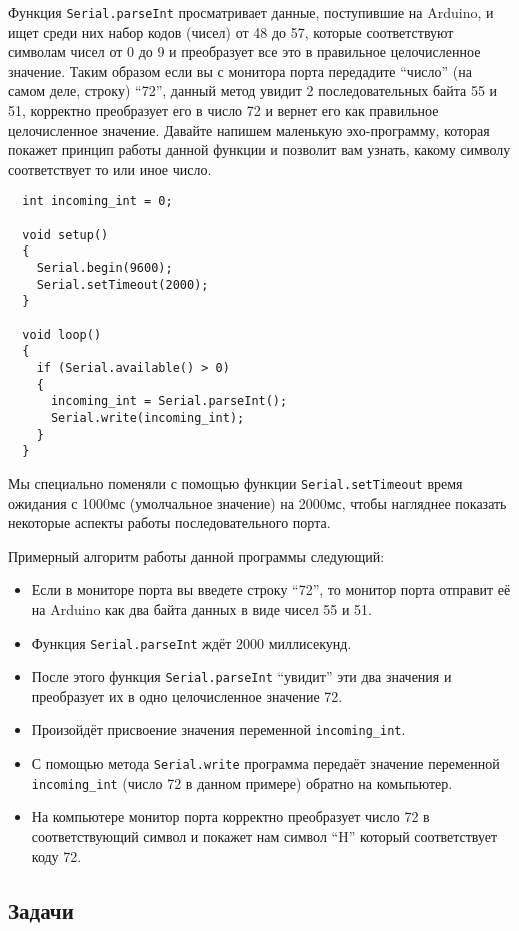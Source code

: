 \documentclass[../sparc.tex]{subfiles}
\begin{document}
Функция \texttt{Serial.parseInt} просматривает данные, поступившие на Arduino, и
ищет среди них набор кодов (чисел) от 48 до 57, которые соответствуют символам
чисел от 0 до 9 и преобразует все это в правильное целочисленное значение. Таким
образом если вы с монитора порта передадите ``число'' (на самом деле, строку)
``72'', данный метод увидит 2 последовательных байта 55 и 51, корректно
преобразует его в число 72 и вернет его как правильное целочисленное значение.
Давайте напишем маленькую эхо-программу, которая покажет принцип работы данной
функции и позволит вам узнать, какому символу соответствует то или иное число.

\begin{verbatim}
  int incoming_int = 0;

  void setup()
  {
    Serial.begin(9600);
    Serial.setTimeout(2000);
  }

  void loop()
  {
    if (Serial.available() > 0)
    {
      incoming_int = Serial.parseInt();
      Serial.write(incoming_int);
    }
  }
\end{verbatim}

Мы специально поменяли с помощью функции \texttt{Serial.setTimeout} время
ожидания с 1000мс (умолчальное значение) на 2000мс, чтобы нагляднее показать
некоторые аспекты работы последовательного порта.

Примерный алгоритм работы данной программы следующий:
\begin{itemize}
  \item Если в мониторе порта вы введете строку
``72'', то монитор порта отправит её на Arduino как два байта данных в виде
чисел 55 и 51.
\item Функция \texttt{Serial.parseInt} ждёт 2000 миллисекунд.
\item После этого функция \texttt{Serial.parseInt} ``увидит'' эти два значения и
  преобразует их в одно целочисленное значение 72.
\item Произойдёт присвоение значения переменной \texttt{incoming\_int}.
\item С помощью метода \texttt{Serial.write} программа передаёт значение
  переменной \texttt{incoming\_int} (число 72 в данном примере) обратно на
  комьпьютер.
\item На компьютере монитор порта корректно преобразует число 72 в
  соответствующий символ и покажет нам символ ``H'' который соответствует коду
  72.
\end{itemize}

\subsection{Задачи}
\end{document}
